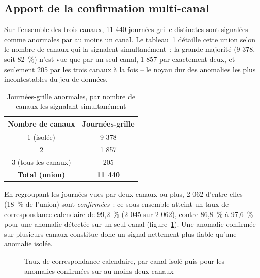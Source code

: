 \subsection{Apport de la confirmation multi-canal}

Sur l'ensemble des trois canaux, 11 440 journées-grille distinctes
sont signalées comme anormales par au moins un canal. Le
tableau~\ref{tab:n-canaux} détaille cette union selon le nombre de
canaux qui la signalent simultanément~: la grande majorité (9 378,
soit 82~\%) n'est vue que par un seul canal, 1 857 par exactement
deux, et seulement 205 par les trois canaux à la fois -- le noyau dur
des anomalies les plus incontestables du jeu de données.

\begin{table}[htbp]
  \centering
  \caption{Journées-grille anormales, par nombre de canaux les signalant simultanément}
  \label{tab:n-canaux}
  \begin{tabular}{cc}
    \toprule
    \textbf{Nombre de canaux} & \textbf{Journées-grille} \\
    \midrule
    1 (isolée)        & 9 378 \\
    2                  & 1 857 \\
    3 (tous les canaux) & 205 \\
    \midrule
    \textbf{Total (union)} & \textbf{11 440} \\
    \bottomrule
  \end{tabular}
\end{table}

En regroupant les journées vues par deux canaux ou plus, 2 062
d'entre elles (18~\% de l'union) sont \emph{confirmées}~: ce
sous-ensemble atteint un taux de correspondance calendaire de
99,2~\% (2 045 sur 2 062), contre 86,8~\% à 97,6~\% pour une anomalie
détectée sur un seul canal (figure~\ref{fig:multicanal}). Une
anomalie confirmée sur plusieurs canaux constitue donc un signal
nettement plus fiable qu'une anomalie isolée.

\begin{figure}[htbp]
  \centering
  \caption{Taux de correspondance calendaire, par canal isolé puis pour les anomalies confirmées sur au moins deux canaux}
  \label{fig:multicanal}
\end{figure}

